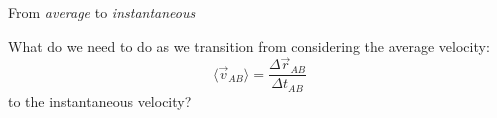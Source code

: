 \documentclass{beamer}
\begin{document}
\begin{frame}
  {From \textit{average} to \textit{instantaneous}}

  What do we need to do as we transition from considering the average velocity:
  $$ \langle \vec{v}_{AB} \rangle = \frac{\Delta\vec{r}_{AB}}{\Delta t_{AB}} $$
  to the instantaneous velocity?
\end{frame}
\end{document}
